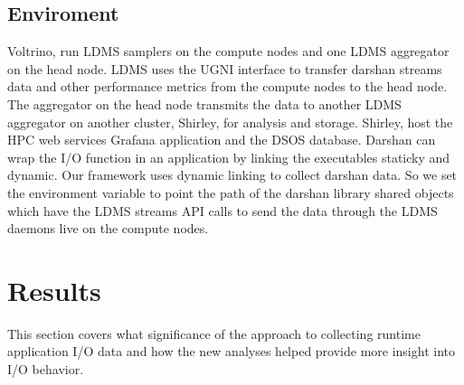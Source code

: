 \subsection{Enviroment}
Voltrino, run LDMS samplers on the compute nodes and one LDMS aggregator on the head node. LDMS uses the UGNI interface to transfer darshan streams data and other performance metrics from the compute nodes to the head node. The aggregator on the head node transmits the data to another LDMS aggregator on another cluster, Shirley, for analysis and storage. Shirley, host the HPC web services Grafana application and the DSOS database. Darshan can wrap the I/O function in an application by linking the executables staticky and dynamic. Our framework uses dynamic linking to collect darshan data. So we set the  environment variable to point the path of the darshan library shared objects which have the LDMS streams API calls to send the data through the LDMS daemons live on the compute nodes. 



\section{Results}
This section covers what significance of the approach to collecting runtime application I/O data and how the new analyses helped provide more insight into I/O behavior. 
